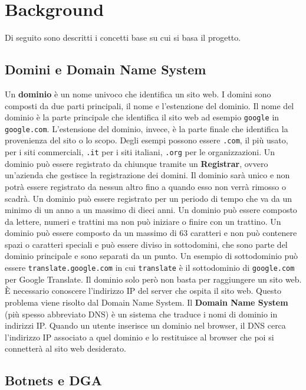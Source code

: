 \documentclass[12pt,a4paper,openright,twoside]{book}
\begin{document}

\chapter{Background}

Di seguito sono descritti i concetti base su cui si basa il progetto.

\section{Domini e Domain Name System}
Un \textbf{dominio} è un nome univoco che identifica un sito web.
I domini sono composti da due parti principali, il nome e l'estenzione del dominio.
Il nome del dominio è la parte principale che identifica il sito web
ad esempio \texttt{google} in \texttt{google.com}.
L'estensione del dominio, invece, è la parte finale
che identifica la provenienza del sito o lo scopo. Degli esempi possono essere
\texttt{.com}, il più usato, per i siti commerciali,
\texttt{.it} per i siti italiani, \texttt{.org} per le organizzazioni.
Un dominio può essere registrato da chiunque tramite
un \textbf{Registrar}, ovvero
un'azienda che gestisce la registrazione dei domini.
Il dominio sarà unico e non potrà essere registrato da nessun altro
fino a quando esso non verrà rimosso o scadrà.
Un dominio può essere registrato per un periodo di tempo
che va da un minimo di un anno a un massimo di dieci anni.
Un dominio può essere composto da lettere, numeri e trattini
ma non può iniziare o finire con un trattino.
Un dominio può essere composto da un massimo di 63 caratteri
e non può contenere spazi o caratteri speciali e 
può essere diviso in sottodomini, che sono
parte del dominio principale e sono separati da un punto.
Un esempio di sottodominio può essere \texttt{translate.google.com} in cui
\texttt{translate} è il sottodominio di \texttt{google.com} per Google Translate.
Il dominio solo però non basta per raggiungere un sito web.
È necessario conoscere l'indirizzo IP
del server che ospita il sito web. 
Questo problema viene risolto dal Domain Name System. \hfill \break
Il \textbf{Domain Name System} (più spesso abbreviato DNS)
è un sistema che traduce i nomi di dominio in indirizzi IP.
Quando un utente inserisce un dominio nel browser, il DNS
cerca l'indirizzo IP associato a quel dominio
e lo restituisce al browser che poi si connetterà al sito web desiderato.


\section{Botnets e DGA}
\end{document}
